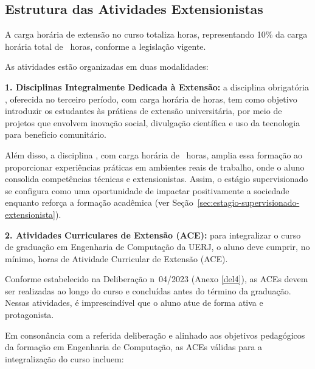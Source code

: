 \subsection{Estrutura das Atividades Extensionistas}

A carga horária de extensão no curso totaliza \hExtensao horas, representando 10\% da carga horária total de \tHorasCurso\ horas, conforme a legislação vigente.

As atividades estão organizadas em duas modalidades:

\textbf{1. Disciplinas Integralmente Dedicada à Extensão:}
a disciplina obrigatória \textbf{\Ext}, oferecida no terceiro período, com carga horária de \ExtCH{ } horas, tem como objetivo introduzir os estudantes às práticas de extensão universitária, por meio de projetos que envolvem inovação social, divulgação científica e uso da tecnologia para benefício comunitário.

Além disso, a disciplina \textbf{\EstSup}, com carga horária de \EstSupCH~horas, amplia essa formação ao proporcionar experiências práticas em ambientes reais de trabalho, onde o aluno consolida competências técnicas e extensionistas. Assim, o estágio supervisionado se configura como uma oportunidade de impactar positivamente a sociedade enquanto reforça a formação acadêmica (ver Seção~\ref{sec:estagio-supervisionado-extensionista}).


\textbf{2. Atividades Curriculares de Extensão (ACE):}
para integralizar o curso de graduação em Engenharia de Computação da UERJ, o aluno deve cumprir, no mínimo, \hACE horas de Atividade Curricular de Extensão (ACE).

Conforme estabelecido na Deliberação n\textordmasculine~04/2023 (Anexo \ref{del4}), as ACEs devem ser realizadas ao longo do curso e concluídas antes do término da graduação. Nessas atividades, é imprescindível que o aluno atue de forma ativa e protagonista.

Em consonância com a referida deliberação e alinhado aos objetivos pedagógicos da formação em Engenharia de Computação, as ACEs válidas para a integralização do curso incluem:


